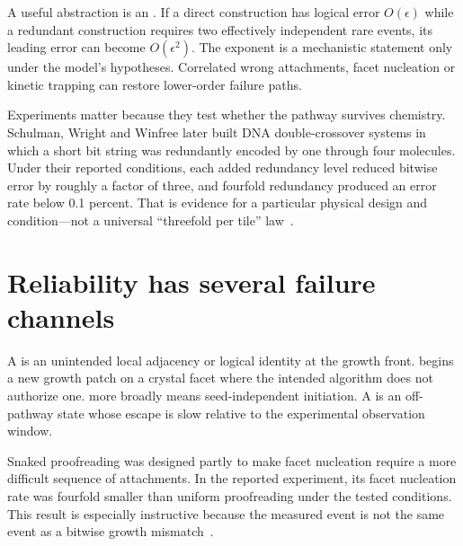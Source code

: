 
A useful abstraction is an . If a direct construction has
logical error $O(\epsilon)$ while a redundant construction requires two effectively
independent rare events, its leading error can become $O(\epsilon^2)$. The exponent
is a mechanistic statement only under the model's hypotheses. Correlated wrong
attachments, facet nucleation or kinetic trapping can restore lower-order failure
paths.

Experiments matter because they test whether the pathway survives chemistry.
Schulman, Wright and Winfree later built DNA double-crossover systems in which a
short bit string was redundantly encoded by one through four molecules. Under their
reported conditions, each added redundancy level reduced bitwise error by roughly a
factor of three, and fourfold redundancy produced an error rate below 0.1 percent.
That is evidence for a particular physical design and condition—not a universal
``threefold per tile'' law~\cite{Schulman2015}.

\section{Reliability has several failure channels}

A  is an unintended local adjacency or logical identity at the growth
front.  begins a new growth patch on a crystal facet where the
intended algorithm does not authorize one.  more broadly
means seed-independent initiation. A  is an off-pathway state
whose escape is slow relative to the experimental observation window.


Snaked proofreading was designed partly to make facet nucleation require a more
difficult sequence of attachments. In the reported experiment, its facet nucleation
rate was fourfold smaller than uniform proofreading under the tested conditions.
This result is especially instructive because the measured event is not the same
event as a bitwise growth mismatch~\cite{Chen2007}.

